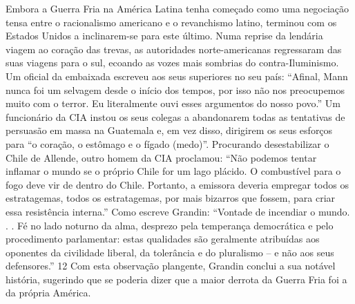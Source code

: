 Embora a Guerra Fria na América Latina tenha começado como uma negociação tensa entre o racionalismo americano e o revanchismo latino, terminou com os Estados Unidos a inclinarem-se para este último. Numa reprise da lendária viagem ao coração das trevas, as autoridades norte-americanas regressaram das suas viagens para o sul, ecoando as vozes mais sombrias do contra-Iluminismo. Um oficial da embaixada escreveu aos seus superiores no seu país: “Afinal, Mann nunca foi um selvagem desde o início dos tempos, por isso não nos preocupemos muito com o terror. Eu literalmente ouvi esses argumentos do nosso povo.” Um funcionário da CIA instou os seus colegas a abandonarem todas as tentativas de persuasão em massa na Guatemala e, em vez disso, dirigirem os seus esforços para “o coração, o estômago e o fígado (medo)”. Procurando desestabilizar o Chile de Allende, outro homem da CIA proclamou: “Não podemos tentar inflamar o mundo se o próprio Chile for um lago plácido. O combustível para o fogo deve vir de dentro do Chile. Portanto, a emissora deveria empregar todos os estratagemas, todos os estratagemas, por mais bizarros que fossem, para criar essa resistência interna.” Como escreve Grandin: “Vontade de incendiar o mundo. . . Fé no lado noturno da alma, desprezo pela temperança democrática e pelo procedimento parlamentar: estas qualidades são geralmente atribuídas aos oponentes da civilidade liberal, da tolerância e do pluralismo – e não aos seus defensores.” {\color{blue}12} Com esta observação plangente, Grandin conclui a sua notável história, sugerindo que se poderia dizer que a maior derrota da Guerra Fria foi a da própria América.